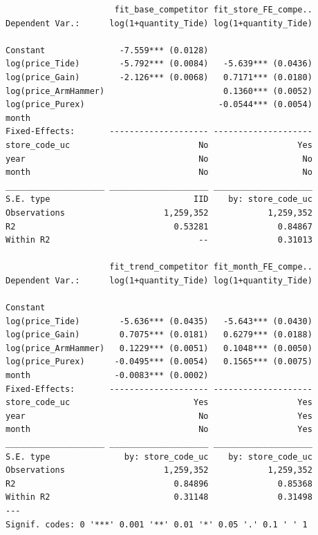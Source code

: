 \documentclass[
]{article}
\begin{document}
\begin{verbatim}
                      fit_base_competitor fit_store_FE_compe..
Dependent Var.:      log(1+quantity_Tide) log(1+quantity_Tide)
                                                              
Constant               -7.559*** (0.0128)                     
log(price_Tide)        -5.792*** (0.0084)   -5.639*** (0.0436)
log(price_Gain)        -2.126*** (0.0068)   0.7171*** (0.0180)
log(price_ArmHammer)                        0.1360*** (0.0052)
log(price_Purex)                           -0.0544*** (0.0054)
month                                                         
Fixed-Effects:       -------------------- --------------------
store_code_uc                          No                  Yes
year                                   No                   No
month                                  No                   No
____________________ ____________________ ____________________
S.E. type                             IID    by: store_code_uc
Observations                    1,259,352            1,259,352
R2                                0.53281              0.84867
Within R2                              --              0.31013

                     fit_trend_competitor fit_month_FE_compe..
Dependent Var.:      log(1+quantity_Tide) log(1+quantity_Tide)
                                                              
Constant                                                      
log(price_Tide)        -5.636*** (0.0435)   -5.643*** (0.0430)
log(price_Gain)        0.7075*** (0.0181)   0.6279*** (0.0188)
log(price_ArmHammer)   0.1229*** (0.0051)   0.1048*** (0.0050)
log(price_Purex)      -0.0495*** (0.0054)   0.1565*** (0.0075)
month                 -0.0083*** (0.0002)                     
Fixed-Effects:       -------------------- --------------------
store_code_uc                         Yes                  Yes
year                                   No                  Yes
month                                  No                  Yes
____________________ ____________________ ____________________
S.E. type               by: store_code_uc    by: store_code_uc
Observations                    1,259,352            1,259,352
R2                                0.84896              0.85368
Within R2                         0.31148              0.31498
---
Signif. codes: 0 '***' 0.001 '**' 0.01 '*' 0.05 '.' 0.1 ' ' 1
\end{verbatim}
\end{document}
